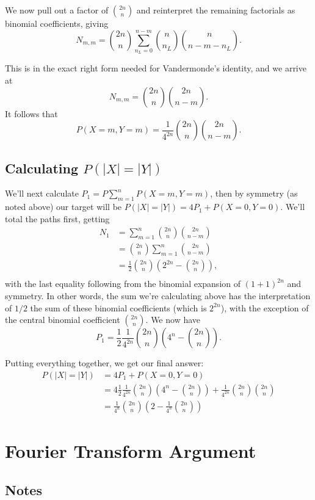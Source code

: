 \documentclass{article}
\begin{document}
We now pull out a factor of $\binom{2n}{n}$ and reinterpret the remaining factorials as binomial coefficients, giving $$N_{m,m} = \binom{2n}{n} \sum_{n_L=0}^{n-m} \binom{n}{n_L} \binom{n}{n-m-n_L}.$$

This is in the exact right form needed for Vandermonde's identity, and we arrive at $$N_{m,m} = \binom{2n}{n}\binom{2n}{n-m}.$$ It follows that $$P(X=m,Y=m) = \frac{1}{4^{2n}} \binom{2n}{n}\binom{2n}{n-m}.$$

\subsection{Calculating $P(|X|=|Y|)$}

We'll next calculate $P_1 = P\sum_{m=1}^{n} P(X=m,Y=m)$, then by symmetry (as noted above) our target will be $P(|X|=|Y|) = 4P_1 + P(X=0,Y=0)$. We'll total the paths first, getting
\begin{align*}
  N_1 &= \sum_{m=1}^{n} \binom{2n}{n}\binom{2n}{n-m} \\
  &= \binom{2n}{n} \sum_{m=1}^{n} \binom{2n}{n-m} \\
  &= \frac{1}{2} \binom{2n}{n} \left(2^{2n} - \binom{2n}{n}\right), \\
\end{align*}
with the last equality following from the binomial expansion of $(1+1)^{2n}$ and symmetry. In other words, the sum we're calculating above has the interpretation of $1/2$ the sum of these binomial coefficients (which is $2^{2n}$), with the exception of the central binomial coefficient $\binom{2n}{n}$. We now have $$P_1 = \frac{1}{2} \frac{1}{4^{2n}} \binom{2n}{n} \left(4^{n} - \binom{2n}{n}\right).$$

Putting everything together, we get our final answer:
\begin{align*}
  P(|X|=|Y|) &= 4P_1+P(X=0,Y=0) \\
  &= 4\frac{1}{2}\frac{1}{4^{2n}} \binom{2n}{n} \left(4^{n} - \binom{2n}{n}\right) + \frac{1}{4^{2n}}\binom{2n}{n}\binom{2n}{n} \\
  &= \frac{1}{4^n} \binom{2n}{n} \left(2 - \frac{1}{4^n} \binom{2n}{n} \right)
\end{align*}

\section{Fourier Transform Argument}

\subsection{Notes}
\end{document}
